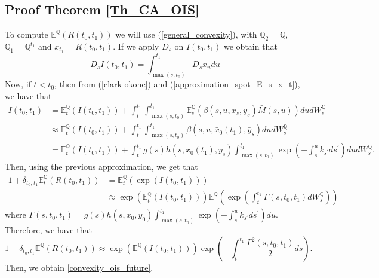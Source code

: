 \documentclass[a4paper,10pt]{article}
\newcommand{\1}{\mathbf{1}}
\begin{document}
\subsection{Proof Theorem \ref{Th_CA_OIS}}\label{Proof_CA_OIS_futures}
To compute $\mathbb{E}^{\mathbb{Q}}\left(R(t_0,t_1)\right)$ we will use (\ref{general_convexity}), with $\mathbb{Q}_2 = \mathbb{Q}$, $\mathbb{Q}_1 = \mathbb{Q}^{t_1}$ and $x_{t_1}=R(t_0,t_1)$. If we apply $D_s$ on $I(t_0,t_1)$ we obtain that
\begin{equation*}
D_s I(t_0,t_1) = \int_{\max(s, t_{0})}^{t_1}  D_s x_u du 
\end{equation*}
Now, if $t < t_0$, then from (\ref{clark-okone}) and (\ref{approximation_spot_E_s_x_t}), we have that 
\begin{align}\label{apprx_I_t0_t1}
I(t_0,t_1) &= \mathbb{E}_t^{\mathbb{Q}}\left(I(t_0,t_1)\right) + \int_{t}^{t_1}\int_{\max(s, t_{0})}^{t_1}  \mathbb{E}_s^{\mathbb{Q}}\left(\beta(s,u,x_s,y_s) \bar{M}(s,u) \right) du dW_s^{\mathbb{Q}} \nonumber \\
&\approx \mathbb{E}_t^{\mathbb{Q}}\left(I(t_0,t_1)\right) + \int_{t}^{t_1}\int_{\max(s, t_{0})}^{t_1} \beta(s,u,\bar{x}_0(t_1),\bar{y}_s) du dW_s^{\mathbb{Q}}\nonumber \\
&= \mathbb{E}_t^{\mathbb{Q}}\left(I(t_0,t_1)\right) + \int_{t}^{t_1} g(s)h(s,\bar{x}_0(t_1),\bar{y}_s)\int_{\max(s, t_{0})}^{t_1} \exp\left( -\int_{s}^{u} k_{s^{\prime}} ds^{\prime}\right) du dW_s^{\mathbb{Q}}.
\end{align}
Then, using the previous approximation, we get that
\begin{align*}
1 + \delta_{t_0,t_1}\mathbb{E}_t^{\mathbb{Q}}\left(R(t_0,t_1)\right) &= \mathbb{E}_t^{\mathbb{Q}}\left( \exp(I(t_0,t_1)) \right)\\
&\approx \exp\left(\mathbb{E}_t^{\mathbb{Q}}\left(I(t_0,t_1)\right)\right)  \mathbb{E}^{\mathbb{Q}}\left(\exp\left(\int_{t}^{t_1} \Gamma(s,t_0,t_1)dW_s^{\mathbb{Q}}\right)\right)
\end{align*}
where $\Gamma(s,t_0,t_1)= g(s)h(s,x_0,y_0)\int_{\max(s, t_{0})}^{t_1} \exp\left( -\int_{s}^{u} k_{s^{\prime}} ds^{\prime}\right)du$.\\
Therefore, we have that
\begin{equation}\label{representation_i_0_t}
1 + \delta_{t_0,t_1}\mathbb{E}^{\mathbb{Q}}\left(R(t_0,t_1)\right) \approx \exp\left(\mathbb{E}^{\mathbb{Q}}\left(I(t_0,t_1)\right)\right)\exp\left(-\int_{t}^{t_1}\frac{\Gamma^{2}(s,t_0,t_1)}{2} ds\right).
\end{equation}
Then, we obtain \eqref{convexity_ois_future}.
\end{document}
